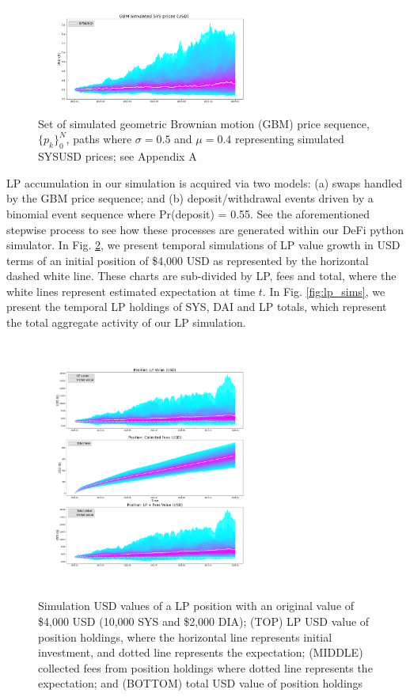 \documentclass[journal,twocolumn,12pt]{ieeesyscoin}
\begin{document}
\begin{figure}[h!]
\includegraphics[width=3in]{img/price_simulations.png}
\caption{Set of simulated geometric Brownian motion (GBM) price sequence, $\{p_{k}\}_{0}^{N}$, paths where $\sigma = 0.5$ and $\mu = 0.4$ representing simulated SYSUSD prices; see Appendix A} 
\label{fig:price_sims}
\end{figure}

LP accumulation in our simulation is acquired via two models: (a) swaps handled by the GBM price sequence; and (b) deposit/withdrawal events driven by a binomial event sequence where Pr(deposit) = 0.55. See the aforementioned stepwise process to see how these processes are generated within our DeFi python simulator. In Fig. \ref{fig:lp_vals}, we present temporal simulations of LP value growth in USD terms of an initial position of \$4,000 USD as represented by the horizontal dashed white line. These charts are sub-divided by LP, fees and total, where the white lines represent estimated expectation at time $t$. In Fig. \ref{fig:lp_sims}, we present the temporal LP holdings of SYS, DAI and LP totals, which represent the total aggregate activity of our LP simulation.

\begin{figure}[h!]
\includegraphics[width=3in]{img/lp_position_values.png}
\caption{Simulation USD values of a LP position with an original value of \$4,000 USD (10,000 SYS and \$2,000 DIA); (TOP) LP USD value of position holdings, where the horizontal line represents initial investment, and dotted line represents the expectation; (MIDDLE) collected fees from position holdings where dotted line represents the expectation; and (BOTTOM) total USD value of position holdings} 
\label{fig:lp_vals}
\end{figure}
\end{document}
